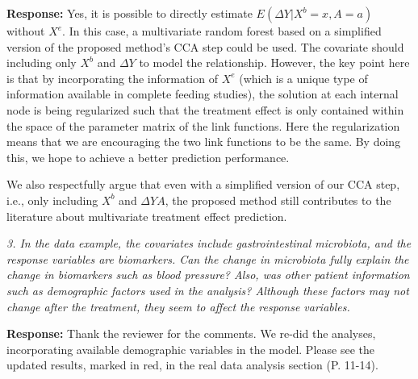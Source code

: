 \documentclass[11pt]{article}
\begin{document}
\medskip

\textbf{Response:} Yes, it is possible to directly estimate $E(\Delta Y | X^b = x,A = a)$ without $X^e$. In this case, a multivariate random forest based on a simplified version of the proposed method's CCA step could be used. The covariate should including only $X^b$ and $\Delta Y$ to model the relationship. However, the key point here is that by incorporating the information of $X^e$ (which is a unique type of information available in complete feeding studies), the solution at each internal node is being regularized such that the treatment effect is only contained within the space of the parameter matrix of the link functions. Here the regularization means that we are encouraging the two link functions to be the same. By doing this, we hope to achieve a better prediction performance. 

We also respectfully argue that even with a simplified version of our CCA step, i.e., only including $X^b$ and $\Delta Y A$, the proposed method still contributes to the literature about multivariate treatment effect prediction. 

\bigskip

{\em 3. In the data example, the covariates include gastrointestinal microbiota, and the response variables are biomarkers. Can the change in microbiota fully explain the change in biomarkers such as blood pressure? Also, was other patient information such as demographic factors used in the analysis? Although these factors may not change after the treatment, they seem to affect the response variables.}

\medskip

\textbf{Response:} Thank the reviewer for the comments. We re-did the analyses, incorporating available demographic variables in the model. Please see the updated results, marked in red, in the real data analysis section (P. 11-14). 
\end{document}
